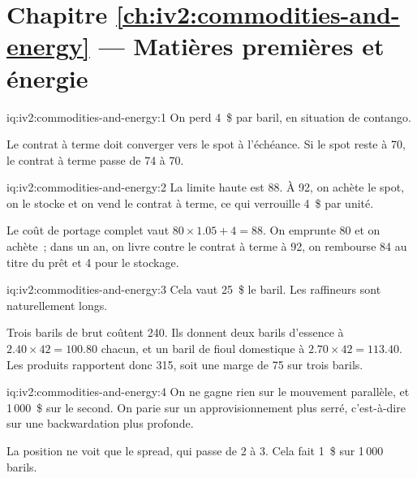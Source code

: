 \section*{Chapitre \ref{ch:iv2:commodities-and-energy} --- Matières premières et énergie}

\begin{solution}{iq:iv2:commodities-and-energy:1}
On perd 4~\$ par baril, en situation de contango.

Le contrat à terme doit converger vers le spot à l'échéance. Si le spot reste à 70, le contrat à terme passe de 74 à 70.

\end{solution}

\begin{solution}{iq:iv2:commodities-and-energy:2}
La limite haute est 88. À 92, on achète le spot, on le stocke et on vend le contrat à terme, ce qui verrouille 4~\$ par unité.

Le coût de portage complet vaut $80 \times 1.05 + 4 = 88$. On emprunte 80 et on achète~; dans un an, on livre contre le contrat à terme à 92, on rembourse 84 au titre du prêt et 4 pour le stockage.

\end{solution}

\begin{solution}{iq:iv2:commodities-and-energy:3}
Cela vaut 25~\$ le baril. Les raffineurs sont naturellement longs.

Trois barils de brut coûtent 240. Ils donnent deux barils d'essence à $2.40 \times 42 = 100.80$ chacun, et un baril de fioul domestique à $2.70 \times 42 = 113.40$. Les produits rapportent donc 315, soit une marge de 75 sur trois barils.

\end{solution}

\begin{solution}{iq:iv2:commodities-and-energy:4}
On ne gagne rien sur le mouvement parallèle, et 1\,000~\$ sur le second. On parie sur un approvisionnement plus serré, c'est-à-dire sur une backwardation plus profonde.

La position ne voit que le spread, qui passe de 2 à 3. Cela fait 1~\$ sur 1\,000 barils.

\end{solution}

